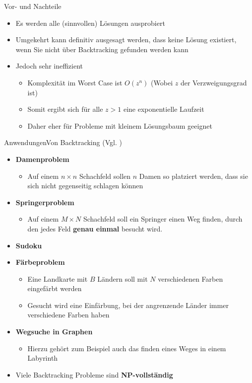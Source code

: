 \begin{frame}{Vor- und Nachteile}
    \begin{itemize}
        \item Es werden alle (sinnvollen) Lösungen ausprobiert
        \item Umgekehrt kann definitiv ausgesagt werden, dass keine Lösung existiert, wenn Sie nicht über Backtracking gefunden werden kann
        \item Jedoch sehr ineffizient
        \begin{itemize}
            \item Komplexität im Worst Case ist $O(z^n)$ (Wobei $z$ der Verzweigungsgrad ist)
            \item Somit ergibt sich für alle $z>1$ eine exponentielle Laufzeit
            \item Daher eher für Probleme mit kleinem Lösungsbaum geeignet
        \end{itemize}
    \end{itemize}
\end{frame}

\begin{frame}[allowframebreaks]{Anwendungen}{Von Backtracking (Vgl. \cite{wiki:backtracking})}
    \begin{itemize}
        \item \textbf{Damenproblem}
        \begin{itemize}
            \item Auf einem $n\times n$ Schachfeld sollen $n$ Damen so platziert werden, dass sie sich nicht gegenseitig schlagen können
        \end{itemize}
        \item \textbf{Springerproblem}
        \begin{itemize}
            \item Auf einem $M\times N$ Schachfeld soll ein Springer einen Weg finden, durch den jedes Feld \textbf{genau einmal} besucht wird.
        \end{itemize}
        \item \textbf{Sudoku}
        \item \textbf{Färbeproblem}
        \begin{itemize}
            \item Eine Landkarte mit $B$ Ländern soll mit $N$ verschiedenen Farben eingefärbt werden
            \item Gesucht wird eine Einfärbung, bei der angrenzende Länder immer verschiedene Farben haben
        \end{itemize}
        \item \textbf{Wegsuche in Graphen}
        \begin{itemize}
            \item Hierzu gehört zum Beispiel auch das finden eines Weges in einem Labyrinth
        \end{itemize}
        \item Viele Backtracking Probleme sind \textbf{NP-vollständig}
    \end{itemize}
\end{frame}